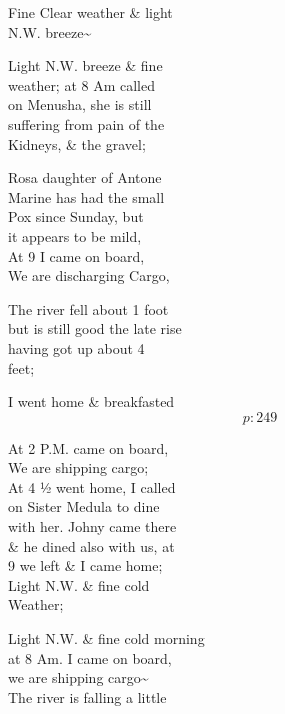\documentclass{report}
\begin{document}
	\par{
 	Fine Clear weather \& light\ \\N.W. breeze\~{}\ \\
	}

	\par{
 	Light N.W. breeze \& fine\ \\weather; at 8 Am called\ \\on Menusha, she is still\ \\suffering from pain of the\ \\Kidneys, \& the gravel;\ \\
	}

	\par{
 	Rosa daughter of Antone\ \\Marine has had the small\ \\Pox since Sunday, but\ \\it appears to be mild,\ \\At 9 I came on board,\ \\We are discharging Cargo,\ \\
	}

	\par{
 	The river fell about 1 foot\ \\but is still good the late rise\ \\having got up about 4\ \\feet;\ \\
	}

	\par{
 	I went home \& breakfasted\ \\
  \[p: 249 \]

	}


	\par{
 	At 2 P.M. came on board,\ \\We are shipping cargo;\ \\At 4 ½ went home, I called\ \\on Sister Medula to dine\ \\with her. Johny came there\ \\\& he dined also with us, at\ \\9 we left \& I came home;\ \\Light N.W. \& fine cold\ \\Weather;\ \\
	}

	\par{
 	Light N.W. \& fine cold morning\ \\at 8 Am. I came on board,\ \\we are shipping cargo\~{}\ \\The river is falling a little\ \\
	}
\end{document}
